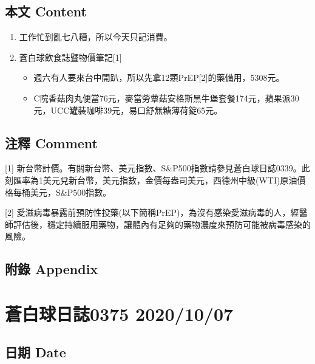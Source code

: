 \documentclass[a5paper, 11pt
]{book}
\providecommand{\tightlist}{%
  \setlength{\itemsep}{0pt}\setlength{\parskip}{0pt}}
\begin{document}
\hypertarget{ux672cux6587-content-33}{%
\subsection{本文 Content}\label{ux672cux6587-content-33}}

\begin{enumerate}
\def\labelenumi{\arabic{enumi}.}
\item
  工作忙到亂七八糟，所以今天只記消費。
\item
  蒼白球飲食誌暨物價筆記{[}1{]}

  \begin{itemize}
  \tightlist
  \item
    週六有人要來台中開趴，所以先拿12顆PrEP{[}2{]}的藥備用，5308元。
  \item
    C院香菇肉丸便當76元，麥當勞蕈菇安格斯黑牛堡套餐174元，蘋果派30元，UCC罐裝咖啡39元，易口舒無糖薄荷錠65元。
  \end{itemize}
\end{enumerate}

\hypertarget{ux6ce8ux91cb-comment-33}{%
\subsection{注釋 Comment}\label{ux6ce8ux91cb-comment-33}}

{[}1{]}
新台幣計價。有關新台幣、美元指數、S\&P500指數請參見蒼白球日誌0339。此刻匯率為1美元兌新台幣，美元指數，金價每盎司美元，西德州中級(WTI)原油價格每桶美元，S\&P500指數。

{[}2{]}
愛滋病毒暴露前預防性投藥(以下簡稱PrEP)，為沒有感染愛滋病毒的人，經醫師評估後，穩定持續服用藥物，讓體內有足夠的藥物濃度來預防可能被病毒感染的風險。

\hypertarget{ux9644ux9304-appendix-33}{%
\subsection{附錄 Appendix}\label{ux9644ux9304-appendix-33}}

\hypertarget{ux84bcux767dux7403ux65e5ux8a8c0375-20201007}{%
\section{蒼白球日誌0375
2020/10/07}\label{ux84bcux767dux7403ux65e5ux8a8c0375-20201007}}

\hypertarget{ux65e5ux671f-date-34}{%
\subsection{日期 Date}\label{ux65e5ux671f-date-34}}
\end{document}
